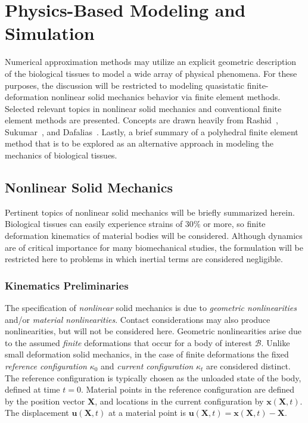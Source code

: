 \chapter{Physics-Based Modeling and Simulation}
\label{chap:4}
%

Numerical approximation methods may utilize an explicit geometric description of the biological tissues to model a wide array of physical phenomena. For these purposes, the discussion will be restricted to modeling quasistatic finite-deformation nonlinear solid mechanics behavior via finite element methods. Selected relevant topics in nonlinear solid mechanics and conventional finite element methods are presented. Concepts are drawn heavily from Rashid~\cite{rashid_2017, rashid_289, rashid_212, rashid_201}, Sukumar~\cite{suku_212}, and Dafalias~\cite{dafalias_205}. Lastly, a brief summary of a polyhedral finite element method that is to be explored as an alternative approach in modeling the mechanics of biological tissues.

\section{Nonlinear Solid Mechanics}
\label{Nonlinear Solid Mechanics}

Pertinent topics of nonlinear solid mechanics will be briefly summarized herein. Biological tissues can easily experience strains of 30$\%$ or more, so finite deformation kinematics of material bodies will be considered. Although dynamics are of critical importance for many biomechanical studies, the formulation will be restricted here to problems in which inertial terms are considered negligible.

\subsection{Kinematics Preliminaries}

The specification of \textit{nonlinear} solid mechanics is due to \textit{geometric nonlinearities} and/or \textit{material nonlinearities}. Contact considerations may also produce nonlinearities, but will not be considered here. Geometric nonlinearities arise due to the assumed \textit{finite} deformations that occur for a body of interest $\mathcal{B}$. Unlike small deformation solid mechanics, in the case of finite deformations the fixed \textit{reference configuration} $\kappa_0$ and \textit{current configuration} $\kappa_t$ are considered distinct. The reference configuration is typically chosen as the unloaded state of the body, defined at time $t=0$. Material points in the reference configuration are defined by the position vector $\bm{X}$, and locations in the current configuration by $\bm{x}(\bm{X},t)$. The displacement $\bm{u}(\bm{X},t)$ at a material point is $\bm{u}(\bm{X},t) = \bm{x}(\bm{X},t) - \bm{X}$.

